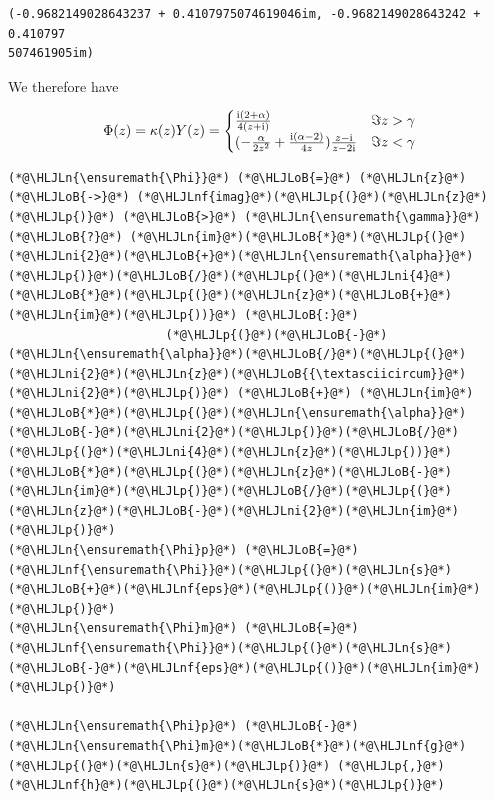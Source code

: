 \documentclass[12pt,a4paper]{article}
\newcommand{\HLJLn}[1]{#1}
\newcommand{\HLJLnf}[1]{\textcolor[RGB]{66,102,213}{#1}}
\newcommand{\HLJLni}[1]{\textcolor[RGB]{59,151,46}{#1}}
\newcommand{\HLJLoB}[1]{\textcolor[RGB]{102,102,102}{\textbf{#1}}}
\newcommand{\HLJLp}[1]{#1}
\def\I{ {\rm i} }
\begin{document}
\begin{lstlisting}
(-0.9682149028643237 + 0.4107975074619046im, -0.9682149028643242 + 0.410797
507461905im)
\end{lstlisting}


We therefore have 

\[
\Phi(z)  = \kappa(z) Y(z) = \begin{cases} 
 {\I (2+\alpha) \over 4 (z+ \I)}  & \Im z > \gamma \\
(-{\alpha \over 2 z^2}+{\I (\alpha-2) \over 4 z}  ) {z - \I  \over z - 2\I} & \Im z < \gamma
\end{cases}
\]

\begin{lstlisting}
(*@\HLJLn{\ensuremath{\Phi}}@*) (*@\HLJLoB{=}@*) (*@\HLJLn{z}@*) (*@\HLJLoB{->}@*) (*@\HLJLnf{imag}@*)(*@\HLJLp{(}@*)(*@\HLJLn{z}@*)(*@\HLJLp{)}@*) (*@\HLJLoB{>}@*) (*@\HLJLn{\ensuremath{\gamma}}@*) (*@\HLJLoB{?}@*) (*@\HLJLn{im}@*)(*@\HLJLoB{*}@*)(*@\HLJLp{(}@*)(*@\HLJLni{2}@*)(*@\HLJLoB{+}@*)(*@\HLJLn{\ensuremath{\alpha}}@*)(*@\HLJLp{)}@*)(*@\HLJLoB{/}@*)(*@\HLJLp{(}@*)(*@\HLJLni{4}@*)(*@\HLJLoB{*}@*)(*@\HLJLp{(}@*)(*@\HLJLn{z}@*)(*@\HLJLoB{+}@*)(*@\HLJLn{im}@*)(*@\HLJLp{))}@*) (*@\HLJLoB{:}@*)
                      (*@\HLJLp{(}@*)(*@\HLJLoB{-}@*)(*@\HLJLn{\ensuremath{\alpha}}@*)(*@\HLJLoB{/}@*)(*@\HLJLp{(}@*)(*@\HLJLni{2}@*)(*@\HLJLn{z}@*)(*@\HLJLoB{{\textasciicircum}}@*)(*@\HLJLni{2}@*)(*@\HLJLp{)}@*) (*@\HLJLoB{+}@*) (*@\HLJLn{im}@*)(*@\HLJLoB{*}@*)(*@\HLJLp{(}@*)(*@\HLJLn{\ensuremath{\alpha}}@*)(*@\HLJLoB{-}@*)(*@\HLJLni{2}@*)(*@\HLJLp{)}@*)(*@\HLJLoB{/}@*)(*@\HLJLp{(}@*)(*@\HLJLni{4}@*)(*@\HLJLn{z}@*)(*@\HLJLp{))}@*)(*@\HLJLoB{*}@*)(*@\HLJLp{(}@*)(*@\HLJLn{z}@*)(*@\HLJLoB{-}@*)(*@\HLJLn{im}@*)(*@\HLJLp{)}@*)(*@\HLJLoB{/}@*)(*@\HLJLp{(}@*)(*@\HLJLn{z}@*)(*@\HLJLoB{-}@*)(*@\HLJLni{2}@*)(*@\HLJLn{im}@*)(*@\HLJLp{)}@*)
(*@\HLJLn{\ensuremath{\Phi}p}@*) (*@\HLJLoB{=}@*) (*@\HLJLnf{\ensuremath{\Phi}}@*)(*@\HLJLp{(}@*)(*@\HLJLn{s}@*)(*@\HLJLoB{+}@*)(*@\HLJLnf{eps}@*)(*@\HLJLp{()}@*)(*@\HLJLn{im}@*)(*@\HLJLp{)}@*) 
(*@\HLJLn{\ensuremath{\Phi}m}@*) (*@\HLJLoB{=}@*) (*@\HLJLnf{\ensuremath{\Phi}}@*)(*@\HLJLp{(}@*)(*@\HLJLn{s}@*)(*@\HLJLoB{-}@*)(*@\HLJLnf{eps}@*)(*@\HLJLp{()}@*)(*@\HLJLn{im}@*)(*@\HLJLp{)}@*) 

(*@\HLJLn{\ensuremath{\Phi}p}@*) (*@\HLJLoB{-}@*) (*@\HLJLn{\ensuremath{\Phi}m}@*)(*@\HLJLoB{*}@*)(*@\HLJLnf{g}@*)(*@\HLJLp{(}@*)(*@\HLJLn{s}@*)(*@\HLJLp{)}@*) (*@\HLJLp{,}@*) (*@\HLJLnf{h}@*)(*@\HLJLp{(}@*)(*@\HLJLn{s}@*)(*@\HLJLp{)}@*)
\end{lstlisting}
\end{document}
